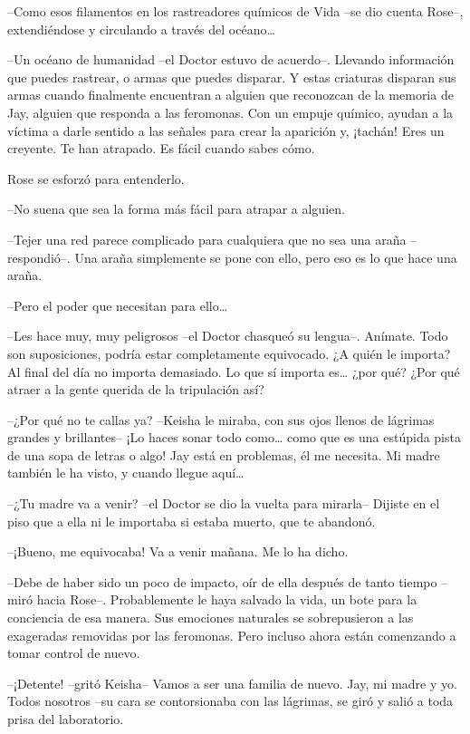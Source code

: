 {--Como esos filamentos en los rastreadores químicos de Vida --se dio
 cuenta Rose--, extendiéndose y circulando a través del océano\ldots{}}

{--Un océano de humanidad --el Doctor estuvo de acuerdo--. Llevando
 información que puedes rastrear, o armas que puedes disparar. Y estas
 criaturas disparan sus armas cuando finalmente encuentran a alguien que
 reconozcan de la memoria de Jay, alguien que responda a las feromonas.
 Con un empuje químico, ayudan a la víctima a darle sentido a las señales
 para crear la aparición y, ¡tachán! Eres un creyente. Te han atrapado.
Es fácil cuando sabes cómo.}

{Rose se esforzó para entenderlo.}

{--No suena que sea la forma más fácil para atrapar a alguien.}

{--Tejer una red parece complicado para cualquiera que no sea una araña
 --respondió--. Una araña simplemente se pone con ello, pero eso es lo
que hace una araña.}

{--Pero el poder que necesitan para ello\ldots{}}

{--Les hace muy, muy peligrosos --el Doctor chasqueó su lengua--.
 Anímate. Todo son suposiciones, podría estar completamente equivocado.
 ¿A quién le importa? Al final del día no importa demasiado. Lo que sí
 importa es\ldots{} ¿por qué? ¿Por qué atraer a la gente querida de la
tripulación así?}

{--¿Por qué no te callas ya? --Keisha le miraba, con sus ojos llenos de
 lágrimas grandes y brillantes-- ¡Lo haces sonar todo como\ldots{} como
 que es una estúpida pista de una sopa de letras o algo! Jay está en
 problemas, él me necesita. Mi madre también le ha visto, y cuando llegue
 aquí\ldots{}}

{--¿Tu madre va a venir? --el Doctor se dio la vuelta para mirarla--
 Dijiste en el piso que a ella ni le importaba si estaba muerto, que te
abandonó.}

{--¡Bueno, me equivocaba! Va a venir mañana. Me lo ha dicho.}

{--Debe de haber sido un poco de impacto, oír de ella después de tanto
 tiempo --miró hacia Rose--. Probablemente le haya salvado la vida, un
 bote para la conciencia de esa manera. Sus emociones naturales se
 sobrepusieron a las exageradas removidas por las feromonas. Pero incluso
ahora están comenzando a tomar control de nuevo.}

{--¡Detente! --gritó Keisha-- Vamos a ser una familia de nuevo. Jay, mi
 madre y yo. Todos nosotros --su cara se contorsionaba con las lágrimas,
se giró y salió a toda prisa del laboratorio.}

